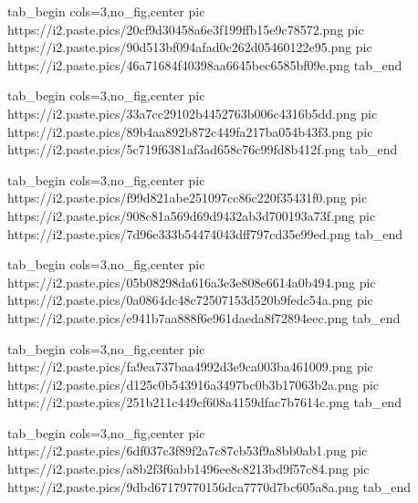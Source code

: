  
 
 
 
 
\zzSecCmtScr

\ifcmt
  tab_begin cols=3,no_fig,center
     pic https://i2.paste.pics/20cf9d30458a6e3f199ffb15e9c78572.png
     pic https://i2.paste.pics/90d513bf094afad0c262d05460122e95.png
     pic https://i2.paste.pics/46a71684f40398aa6645bec6585bf09e.png
  tab_end
\fi

\ifcmt
  tab_begin cols=3,no_fig,center
     pic https://i2.paste.pics/33a7cc29102b4452763b006c4316b5dd.png
     pic https://i2.paste.pics/89b4aa892b872c449fa217ba054b43f3.png
     pic https://i2.paste.pics/5c719f6381af3ad658c76c99fd8b412f.png
  tab_end
\fi

\ifcmt
  tab_begin cols=3,no_fig,center
     pic https://i2.paste.pics/f99d821abe251097cc86c220f35431f0.png
     pic https://i2.paste.pics/908c81a569d69d9432ab3d700193a73f.png
     pic https://i2.paste.pics/7d96e333b54474043dff797cd35e99ed.png
  tab_end
\fi

\ifcmt
  tab_begin cols=3,no_fig,center
     pic https://i2.paste.pics/05b08298da616a3e3e808e6614a0b494.png
     pic https://i2.paste.pics/0a0864dc48c72507153d520b9fedc54a.png
     pic https://i2.paste.pics/e941b7aa888f6e961daeda8f72894eec.png
  tab_end
\fi

\ifcmt
  tab_begin cols=3,no_fig,center
     pic https://i2.paste.pics/fa9ea737baa4992d3e9ca003ba461009.png
     pic https://i2.paste.pics/d125c0b543916a3497bc0b3b17063b2a.png
     pic https://i2.paste.pics/251b211c449cf608a4159dfac7b7614c.png
  tab_end
\fi

\ifcmt
  tab_begin cols=3,no_fig,center
     pic https://i2.paste.pics/6df037c3f89f2a7c87cb53f9a8bb0ab1.png
     pic https://i2.paste.pics/a8b2f3f6abb1496ee8c8213bd9f57c84.png
     pic https://i2.paste.pics/9dbd67179770156dca7770d7bc605a8a.png
  tab_end
\fi
